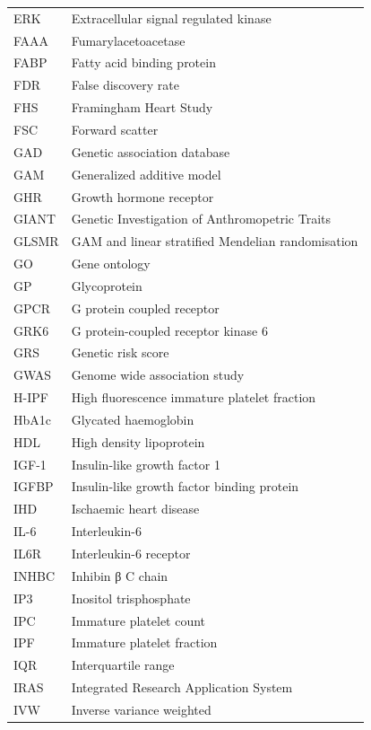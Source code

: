 \documentclass[11pt,twoside]{bristolthesis}
\begin{document}
\begin{abbreviations}
\begin{longtable}[t]{ll}
    ERK & Extracellular signal regulated kinase\\
    FAAA & Fumarylacetoacetase\\
    FABP & Fatty acid binding protein\\
    \addlinespace
    FDR & False discovery rate\\
    FHS & Framingham Heart Study\\
    FSC & Forward scatter\\
    GAD & Genetic association database\\
    \addlinespace
    GAM & Generalized additive model\\
    GHR & Growth hormone receptor\\
    GIANT & Genetic Investigation of Anthromopetric Traits\\
    GLSMR & GAM and linear stratified Mendelian randomisation\\
    GO & Gene ontology\\
    \addlinespace
    GP & Glycoprotein\\
    GPCR & G protein coupled receptor\\
    GRK6 & G protein-coupled receptor kinase 6\\
    GRS & Genetic risk score\\
    GWAS & Genome wide association study\\
    \addlinespace
    H-IPF & High fluorescence immature platelet fraction\\
    HbA1c & Glycated haemoglobin\\
    HDL & High density lipoprotein\\
    IGF-1 & Insulin-like growth factor 1\\
    IGFBP & Insulin-like growth factor binding protein\\
    \addlinespace
    IHD & Ischaemic heart disease\\
    IL-6 & Interleukin-6\\
    IL6R & Interleukin-6 receptor\\
    INHBC & Inhibin β C chain\\
    IP3 & Inositol trisphosphate\\
    \addlinespace
    IPC & Immature platelet count\\
    IPF & Immature platelet fraction\\
    IQR & Interquartile range\\
    IRAS & Integrated Research Application System\\
    IVW & Inverse variance weighted\\

\end{longtable}
\end{abbreviations}
\end{document}
